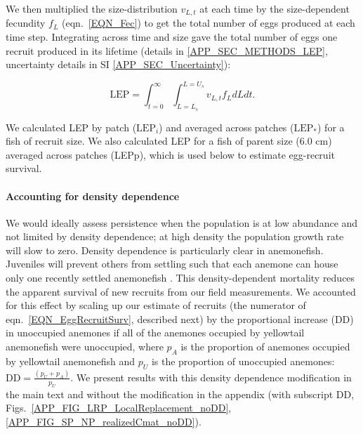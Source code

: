 \documentclass[12pt, oneside]{article}   	%
\begin{document}
We then multiplied the size-distribution $v_{L,t}$ at each time by the size-dependent fecundity $f_L$ (eqn.\ \ref{EQN_Fec}) to get the total number of eggs produced at each time step. Integrating across time and size gave the total number of eggs one recruit produced in its lifetime (details in \ref{APP_SEC_METHODS_LEP}, uncertainty details in SI \ref{APP_SEC_Uncertainty}): %

\begin{equation}
\text{LEP} = \int_{t=0}^{\infty}\int_{L=L_s}^{L=U_s} v_{L,t} f_L dL dt. \label{EQN_LEP}
\end{equation}

We calculated LEP by patch ($\text{LEP}_i$) and averaged across patches ($\text{LEP}_*$) for a fish of recruit size. We also calculated LEP for a fish of parent size (6.0 cm) averaged across patches (LEPp), which is used below to estimate egg-recruit survival.

\paragraph*{Accounting for density dependence}  %

We would ideally assess persistence when the population is at low abundance and not limited by density dependence; at high density the population growth rate will slow to zero. Density dependence is particularly clear in anemonefish. Juveniles will prevent others from settling such that each anemone can house only one recently settled anemonefish \citep{buston2003forcible}. This density-dependent mortality reduces the apparent survival of new recruits from our field measurements. We accounted for this effect by scaling up our estimate of recruits (the numerator of eqn.\ \ref{EQN_EggRecruitSurv}, described next) by the proportional increase ($\text{DD}$) in unoccupied anemones if all of the anemones occupied by yellowtail anemonefish were unoccupied, where $p_A$ is the proportion of anemones occupied by yellowtail anemonefish and $p_U$ is the proportion of unoccupied anemones: $\text{DD} = \frac{(p_U + p_A)}{p_U}$. We present results with this density dependence modification in the main text and without the modification in the appendix (with subscript DD, Figs.\ \ref{APP_FIG_LRP_LocalReplacement_noDD}, \ref{APP_FIG_SP_NP_realizedCmat_noDD}). %
\end{document}
